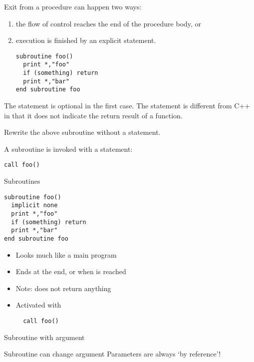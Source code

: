Exit from a procedure can happen two ways:
\begin{enumerate}
\item the flow of control reaches the end of the procedure body, or
\item execution is finished by an explicit 
  statement.
\begin{lstlisting}
subroutine foo()
  print *,"foo"
  if (something) return
  print *,"bar"
end subroutine foo
\end{lstlisting}
\end{enumerate}
The  statement is optional in the first case.
The  statement is different from C++ in that it does not
indicate the return result of a function.

\begin{exercise}
  Rewrite the above subroutine  without a  statement.
\end{exercise}

A subroutine is invoked with a  statement:
\begin{lstlisting}
call foo()
\end{lstlisting}

\begin{slide}{Subroutines}
  \label{sl:subroutine}
\begin{lstlisting}
subroutine foo()
  implicit none
  print *,"foo"
  if (something) return
  print *,"bar"
end subroutine foo
\end{lstlisting}
\begin{itemize}
\item Looks much like a main program
\item Ends at the end, or when  is reached
\item Note:  does not return anything
\item Activated with 
\begin{lstlisting}
  call foo()
\end{lstlisting}
\end{itemize}
\end{slide}

\begin{block}{Subroutine with argument}
  \label{sl:fsubr-arg}
\end{block}

\begin{block}{Subroutine can change argument}
  \label{sl:fsubr-inout}
  Parameters are always `by reference'!
\end{block}

